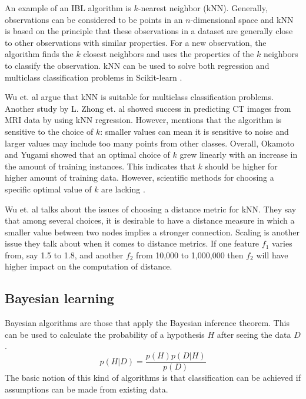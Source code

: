 	An example of an IBL algorithm is $k$-nearest neighbor (kNN). Generally, observations can be considered to be points in an $n$-dimensional space and kNN is based on the principle that these observations in a dataset are generally close to other observations with similar properties.  For a new observation, the algorithm finds the $k$ closest neighbors and uses the properties of the $k$ neighbors to classify the observation. kNN can be used to solve both regression and multiclass classification problems in Scikit-learn \cite{WEBSITE:17, WEBSITE:18}.

	Wu et. al \cite{ARTICLE:9} argue that kNN is suitable for multiclass classification problems. Another study by L. Zhong et. al \cite{IP:3} showed success in predicting CT images from MRI data by using kNN regression. However, \cite{ARTICLE:9} mentions that the algorithm is sensitive to the choice of $k$: smaller values can mean it is sensitive to noise and larger values may include too many points from other classes. Overall, Okamoto and Yugami \cite{ARTICLE:12} showed that an optimal choice of $k$ grew linearly with an increase in the amount of training instances. This indicates that $k$ should be higher for higher amount of training data. However, scientific methods for choosing a specific optimal value of $k$  are lacking \cite{ARTICLE:7}.

	Wu et. al \cite{ARTICLE:9} talks about the issues of choosing a distance metric for kNN. They say that among several choices, it is desirable to have a distance measure in which a smaller value between two nodes implies a stronger connection. Scaling is another issue they talk about when it comes to distance metrics. If one feature $f_1$ varies from, say 1.5 to 1.8, and another $f_2$ from 10,000 to 1,000,000 then $f_2$ will have higher impact on the computation of distance. 
	
	
	\subsection{Bayesian learning}
		Bayesian algorithms are those that apply the Bayesian inference theorem. This can be used to calculate the probability of a hypothesis $H$ after seeing the data $D$.
		\begin{equation} \label{eq:bayes}
			p(H|D) = \frac{p(H)p(D|H)}{p(D)}
		\end{equation} 
	The basic notion of this kind of algorithms is that classification can be achieved if assumptions can be made from existing data. %

